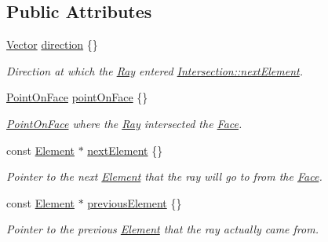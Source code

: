 \subsection*{Public Attributes}
\begin{DoxyCompactItemize}
\item 
\mbox{\label{structraytracer_1_1Intersection_ad63fbc92920b6ce5e0f939fba89ae0dc}} 
\hyperlink{classraytracer_1_1Vector}{Vector} \hyperlink{structraytracer_1_1Intersection_ad63fbc92920b6ce5e0f939fba89ae0dc}{direction} \{\}
\begin{DoxyCompactList}\small\item\em Direction at which the \hyperlink{classraytracer_1_1Ray}{Ray} entered \hyperlink{structraytracer_1_1Intersection_afb09dd39bcd8d80373b47e36ba66fcf5}{Intersection\+::next\+Element}. \end{DoxyCompactList}\item 
\mbox{\label{structraytracer_1_1Intersection_acd9214a1aca8b4e65008eb02a3d910fd}} 
\hyperlink{structraytracer_1_1PointOnFace}{Point\+On\+Face} \hyperlink{structraytracer_1_1Intersection_acd9214a1aca8b4e65008eb02a3d910fd}{point\+On\+Face} \{\}
\begin{DoxyCompactList}\small\item\em \hyperlink{structraytracer_1_1PointOnFace}{Point\+On\+Face} where the \hyperlink{classraytracer_1_1Ray}{Ray} intersected the \hyperlink{classraytracer_1_1Face}{Face}. \end{DoxyCompactList}\item 
const \hyperlink{classraytracer_1_1Element}{Element} $\ast$ \hyperlink{structraytracer_1_1Intersection_afb09dd39bcd8d80373b47e36ba66fcf5}{next\+Element} \{\}
\begin{DoxyCompactList}\small\item\em Pointer to the next \hyperlink{classraytracer_1_1Element}{Element} that the ray will go to from the \hyperlink{classraytracer_1_1Face}{Face}. \end{DoxyCompactList}\item 
const \hyperlink{classraytracer_1_1Element}{Element} $\ast$ \hyperlink{structraytracer_1_1Intersection_aa4f4ef637299868b38290af358031832}{previous\+Element} \{\}
\begin{DoxyCompactList}\small\item\em Pointer to the previous \hyperlink{classraytracer_1_1Element}{Element} that the ray actually came from. \end{DoxyCompactList}\end{DoxyCompactItemize}


